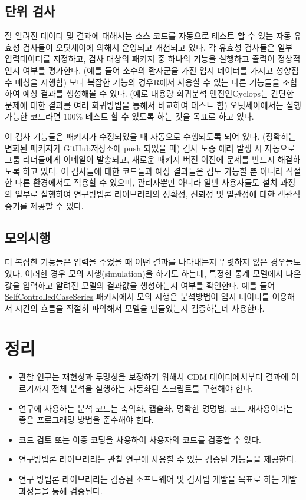 \documentclass[11pt]{book}
\theoremstyle{definition}
\theoremstyle{definition}
\theoremstyle{definition}
\theoremstyle{remark}
\let\BeginKnitrBlock\begin \let\EndKnitrBlock\end
\begin{document}
\subsection{단위 검사}\label{-}

잘 알려진 데이터 및 결과에 대해서는 소스 코드를 자동으로 테스트 할 수
있는 자동 유효성 검사들이 오딧세이에 의해서 운영되고 개선되고 있다. 각
유효성 검사들은 일부 입력데이터를 지정하고, 검사 대상의 패키지 중 하나의
기능을 실행하고 출력이 정상적인지 여부를 평가한다. (예를 들어 소수의
환자군을 가진 임시 데이터를 가지고 성향점수 매칭을 시행함) 보다 복잡한
기능의 경우R에서 사용할 수 있는 다른 기능들을 조합하여 예상 결과를
생성해볼 수 있다. (예로 대용량 회귀분석 엔진인Cyclops는 간단한 문제에
대한 결과를 여러 회귀방법을 통해서 비교하여 테스트 함) 오딧세이에서는
실행 가능한 코드라면 100\% 테스트 할 수 있도록 하는 것을 목표로 하고
있다.

이 검사 기능들은 패키지가 수정되었을 때 자동으로 수행되도록 되어 있다.
(정확히는 변화된 패키지가 GitHub저장소에 push 되었을 때) 검사 도중 에러
발생 시 자동으로 그룹 리더들에게 이메일이 발송되고, 새로운 패키지 버전
이전에 문제를 반드시 해결하도록 하고 있다. 이 검사들에 대한 코드들과
예상 결과들은 검토 가능할 뿐 아니라 적절한 다른 환경에서도 적용할 수
있으며, 관리자뿐만 아니라 일반 사용자들도 설치 과정의 일부로 실행하여
연구방법론 라이브러리의 정확성, 신뢰성 및 일관성에 대한 객관적 증거를
제공할 수 있다.

\subsection{모의시행}

더 복잡한 기능들은 입력을 주었을 때 어떤 결과를 나타내는지 뚜렷하지 않은
경우들도 있다. 이러한 경우 모의 시행(simulation)을 하기도 하는데, 특정한
통계 모델에서 나온 값을 입력하고 알려진 모델의 결과값을 생성하는지
여부를 확인한다. 예를 들어
\href{https://ohdsi.github.io/SelfControlledCaseSeries/}{SelfControlledCaseSeries}
패키지에서 모의 시행은 분석방법이 임시 데이터를 이용해서 시간의 흐름을
적절히 파악해서 모델을 만들었는지 검증하는데 사용한다.

\section{정리}

\BeginKnitrBlock{rmdsummary}
\begin{itemize}
\item
  관찰 연구는 재현성과 투명성을 보장하기 위해서 CDM 데이터에서부터
  결과에 이르기까지 전체 분석을 실행하는 자동화된 스크립트를 구현해야
  한다.
\item
  연구에 사용하는 분석 코드는 축약화, 캡슐화, 명확한 명명법, 코드
  재사용이라는 좋은 프로그래밍 방법을 준수해야 한다.
\item
  코드 검토 또는 이중 코딩을 사용하여 사용자의 코드를 검증할 수 있다.
\item
  연구방법론 라이브러리는 관찰 연구에 사용할 수 있는 검증된 기능들을
  제공한다.
\item
  연구 방법론 라이브러리는 검증된 소프트웨어 및 검사법 개발을 목표로
  하는 개발 과정들을 통해 검증된다.
\end{itemize}
\EndKnitrBlock{rmdsummary}
\end{document}
